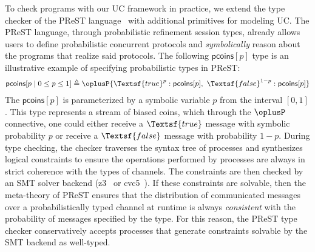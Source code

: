 To check programs with our UC framework in practice, we extend the type checker of the
PReST language~\cite{prest} with additional primitives for modeling UC. The PReST
language, through probabilistic refinement session types, already allows users to define
probabilistic concurrent protocols and \emph{symbolically} reason about the programs that
realize said protocols. The following $\textsf{pcoins}[p]$ type is an illustrative example of 
specifying probabilistic types in PReST:
\begin{align*}
  \textsf{pcoins}[p \mid 0 \leq p \leq 1] \triangleq 
    \oplusP\{ \Textsf{true}^{p} : \textsf{pcoins}[p]
           ,\ \Textsf{false}^{1 - p} : \textsf{pcoins}[p] \}
\end{align*}
The $\textsf{pcoins}[p]$ is parameterized by a symbolic variable $p$ from the
interval $[0, 1]$. This type represents a stream of biased coins, which through
the $\oplusP$ connective, one could either receive a $\Textsf{true}$ message
with symbolic probability $p$ or receive a $\Textsf{false}$ message with
probability $1 - p$.  During type checking, the checker traverses the syntax
tree of processes and synthesizes logical constraints to ensure the operations
performed by processes are always in strict coherence with the types of
channels. The constraints are then checked by an SMT solver backend
(z3~\cite{z3} or cvc5~\cite{cvc5}). If these constraints are solvable, then the
meta-theory of PReST ensures that the distribution of communicated messages over
a probabilistically typed channel at runtime is always \emph{consistent} with
the probability of messages specified by the type. For this reason, the PReST
type checker conservatively accepts processes that generate constraints solvable
by the SMT backend as well-typed.

